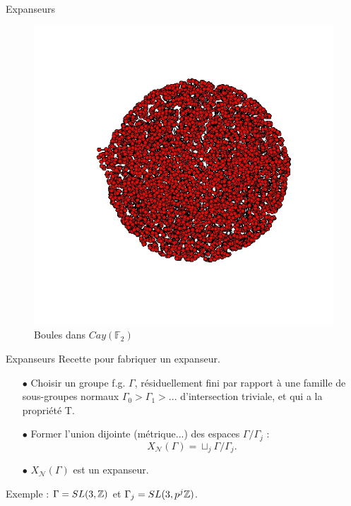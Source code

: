 \begin{frame}{Expanseurs}
\begin{figure}[h]\centering
\includegraphics[scale=0.35]{CayleyFree5.jpeg}
\caption{Boules dans $Cay(\mathbb F_2)$}
\label{fig:Cayley4}
\end{figure}
\end{frame}

\begin{frame}{Expanseurs}
Recette pour fabriquer un expanseur.
\begin{itemize}
\item[$\bullet$] Choisir un groupe f.g. $\Gamma$, résiduellement fini par rapport à une famille de sous-groupes normaux $\Gamma_0 > \Gamma_1>...$ d'intersection triviale, et qui a la propriété T.
\item[$\bullet$] Former l'union dijointe (métrique...) des espaces $\Gamma/\Gamma_j$ :\[X_{\mathcal N}(\Gamma)=\sqcup_j \Gamma/\Gamma_j.\]
\item[$\bullet$] $X_{\mathcal N}(\Gamma)$ est un expanseur.
\end{itemize}

Exemple : $\Gamma = SL(3,\mathbb Z)$ et $ \Gamma_j = SL(3,p^j\mathbb Z)$.
\end{frame}

